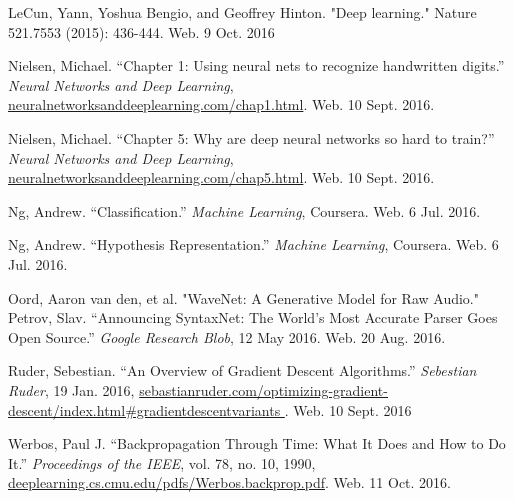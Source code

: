 \documentclass[12pt, titlepage]{article}
\begin{document}
\begin{thebibliography}{9}
		LeCun, Yann, Yoshua Bengio, and Geoffrey Hinton. "Deep learning." Nature
		521.7553 (2015): 436-444. Web. 9 Oct. 2016

		Nielsen, Michael. ``Chapter 1: Using neural nets to recognize
		handwritten digits.'' \textit{Neural Networks and Deep Learning},
		\url{neuralnetworksanddeeplearning.com/chap1.html}. Web. 10 Sept. 2016.

		Nielsen, Michael. ``Chapter 5: Why are deep neural networks so hard to
		train?'' \textit{Neural Networks and Deep Learning},
		\url{neuralnetworksanddeeplearning.com/chap5.html}. Web. 10 Sept. 2016.

		Ng, Andrew. ``Classification.'' \textit{Machine Learning}, Coursera.
		Web. 6 Jul. 2016.

		Ng, Andrew. ``Hypothesis Representation.'' \textit{Machine Learning}, Coursera.
		Web. 6 Jul. 2016.

		Oord, Aaron van den, et al. "WaveNet: A Generative Model for Raw Audio."
		Petrov, Slav. ``Announcing SyntaxNet: The World's Most Accurate Parser
		Goes Open Source.'' \textit{Google Research Blob}, 12 May 2016. Web. 20
		Aug. 2016.

		Ruder, Sebestian. ``An Overview of Gradient Descent Algorithms.''
		\textit{Sebestian Ruder}, 19 Jan. 2016,
		\url{sebastianruder.com/optimizing-gradient-descent/index.html#gradientdescentvariants
		}. Web. 10 Sept. 2016

		Werbos, Paul J. ``Backpropagation Through Time: What It Does and How to
		Do It.'' \textit{Proceedings of the IEEE}, vol. 78, no. 10, 1990,
		\url{deeplearning.cs.cmu.edu/pdfs/Werbos.backprop.pdf}. Web. 11 Oct.
		2016.

\end{thebibliography}
\end{document}
